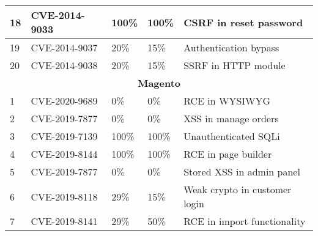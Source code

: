 \begin{table*}[]
\begin{adjustbox}{max width=0.65\textwidth}
\begin{tabular}{|lllll|}
    \multicolumn{1}{|l|}{18}          & \multicolumn{1}{l|}{CVE-2014-9033}    & \multicolumn{1}{l|}{100\%}                & \multicolumn{1}{l|}{100\%}             & CSRF in reset password                  \\ \hline
    \multicolumn{1}{|l|}{19}          & \multicolumn{1}{l|}{CVE-2014-9037}    & \multicolumn{1}{l|}{20\%}                 & \multicolumn{1}{l|}{15\%}              & Authentication bypass                   \\ \hline
    \multicolumn{1}{|l|}{20}          & \multicolumn{1}{l|}{CVE-2014-9038}    & \multicolumn{1}{l|}{20\%}                 & \multicolumn{1}{l|}{15\%}              & SSRF in HTTP module                     \\ \hline
    \multicolumn{5}{|c|}{\textbf{Magento}}                                                                                                                                                                   \\ \hline
    \multicolumn{1}{|l|}{1}           & \multicolumn{1}{l|}{CVE-2020-9689}   & \multicolumn{1}{l|}{0\%}                   & \multicolumn{1}{l|}{0\%}               & RCE in WYSIWYG                           \\ \hline
    \multicolumn{1}{|l|}{2}           & \multicolumn{1}{l|}{CVE-2019-7877}   & \multicolumn{1}{l|}{0\%}                   & \multicolumn{1}{l|}{0\%}               & XSS in manage orders                     \\ \hline
    \multicolumn{1}{|l|}{3}           & \multicolumn{1}{l|}{CVE-2019-7139}   & \multicolumn{1}{l|}{100\%}                 & \multicolumn{1}{l|}{100\%}             & Unauthenticated SQLi                     \\ \hline
    \multicolumn{1}{|l|}{4}           & \multicolumn{1}{l|}{CVE-2019-8144}   & \multicolumn{1}{l|}{100\%}                 & \multicolumn{1}{l|}{100\%}             & RCE in page builder                      \\ \hline
    \multicolumn{1}{|l|}{5}           & \multicolumn{1}{l|}{CVE-2019-7877}   & \multicolumn{1}{l|}{0\%}                   & \multicolumn{1}{l|}{0\%}               & Stored XSS in admin panel                \\ \hline
    \multicolumn{1}{|l|}{6}           & \multicolumn{1}{l|}{CVE-2019-8118}   & \multicolumn{1}{l|}{29\%}                  & \multicolumn{1}{l|}{15\%}              & Weak crypto in customer login            \\ \hline
    \multicolumn{1}{|l|}{7}           & \multicolumn{1}{l|}{CVE-2019-8141}   & \multicolumn{1}{l|}{29\%}                  & \multicolumn{1}{l|}{50\%}              & RCE in import functionality              \\ \hline

\end{tabular}
\end{adjustbox}
\end{table*}

